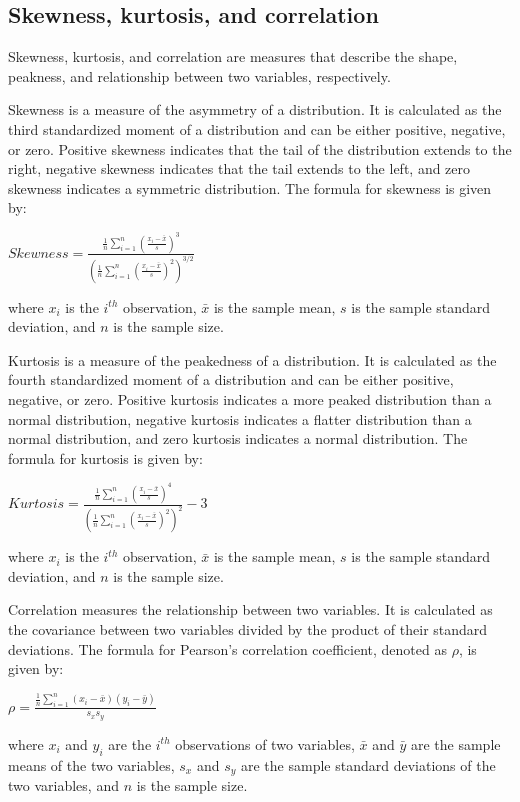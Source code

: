 \documentclass[12pt, a4paper, oneside]{article}
\begin{document}
\subsection{ Skewness, kurtosis, and correlation  }
Skewness, kurtosis, and correlation are measures that describe the shape, peakness, and relationship between two variables, respectively.

Skewness is a measure of the asymmetry of a distribution. It is calculated as the third standardized moment of a distribution and can be either positive, negative, or zero. Positive skewness indicates that the tail of the distribution extends to the right, negative skewness indicates that the tail extends to the left, and zero skewness indicates a symmetric distribution. The formula for skewness is given by:

$Skewness = \frac{\frac{1}{n} \sum_{i=1}^{n} (\frac{x_i - \bar{x}}{s})^3}{(\frac{1}{n} \sum_{i=1}^{n} (\frac{x_i - \bar{x}}{s})^2)^{3/2}}$

where $x_i$ is the $i^{th}$ observation, $\bar{x}$ is the sample mean, $s$ is the sample standard deviation, and $n$ is the sample size.

Kurtosis is a measure of the peakedness of a distribution. It is calculated as the fourth standardized moment of a distribution and can be either positive, negative, or zero. Positive kurtosis indicates a more peaked distribution than a normal distribution, negative kurtosis indicates a flatter distribution than a normal distribution, and zero kurtosis indicates a normal distribution. The formula for kurtosis is given by:

$Kurtosis = \frac{\frac{1}{n} \sum_{i=1}^{n} (\frac{x_i - \bar{x}}{s})^4}{(\frac{1}{n} \sum_{i=1}^{n} (\frac{x_i - \bar{x}}{s})^2)^2} - 3$

where $x_i$ is the $i^{th}$ observation, $\bar{x}$ is the sample mean, $s$ is the sample standard deviation, and $n$ is the sample size.

Correlation measures the relationship between two variables. It is calculated as the covariance between two variables divided by the product of their standard deviations. The formula for Pearson's correlation coefficient, denoted as $\rho$, is given by:

$\rho = \frac{\frac{1}{n} \sum_{i=1}^{n} (x_i - \bar{x})(y_i - \bar{y})}{s_x s_y}$

where $x_i$ and $y_i$ are the $i^{th}$ observations of two variables, $\bar{x}$ and $\bar{y}$ are the sample means of the two variables, $s_x$ and $s_y$ are the sample standard deviations of the two variables, and $n$ is the sample size.
\end{document}
